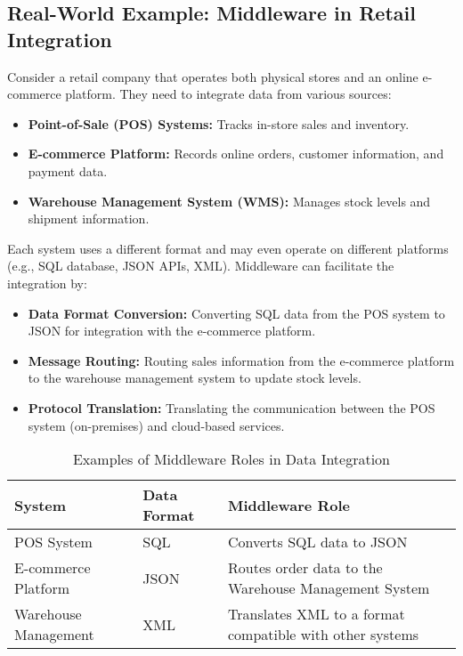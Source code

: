 \documentclass[12pt]{article}
\begin{document}
\subsection{Real-World Example: Middleware in Retail Integration}
Consider a retail company that operates both physical stores and an online e-commerce platform. They need to integrate data from various sources:
\begin{itemize}
    \item \textbf{Point-of-Sale (POS) Systems:} Tracks in-store sales and inventory.
    \item \textbf{E-commerce Platform:} Records online orders, customer information, and payment data.
    \item \textbf{Warehouse Management System (WMS):} Manages stock levels and shipment information.
\end{itemize}

Each system uses a different format and may even operate on different platforms (e.g., SQL database, JSON APIs, XML). Middleware can facilitate the integration by:
\begin{itemize}
    \item \textbf{Data Format Conversion:} Converting SQL data from the POS system to JSON for integration with the e-commerce platform.
    \item \textbf{Message Routing:} Routing sales information from the e-commerce platform to the warehouse management system to update stock levels.
    \item \textbf{Protocol Translation:} Translating the communication between the POS system (on-premises) and cloud-based services.
\end{itemize}

\begin{table}[h]
    \centering
    \begin{tabular}{|p{4cm}|p{3cm}|p{7cm}|}
        \hline
        \textbf{System} & \textbf{Data Format} & \textbf{Middleware Role} \\ \hline
        POS System & SQL & Converts SQL data to JSON \\ \hline
        E-commerce Platform & JSON & Routes order data to the Warehouse Management System \\ \hline
        Warehouse Management & XML & Translates XML to a format compatible with other systems \\ \hline
    \end{tabular}
    \caption{Examples of Middleware Roles in Data Integration}
\end{table}
\end{document}
